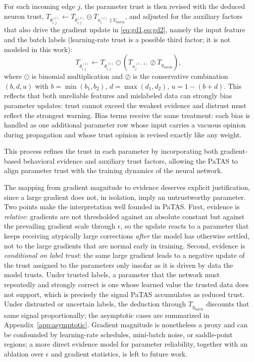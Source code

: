 For each incoming edge \(j\), the parameter trust is then revised with the deduced neuron trust, \(T_{\theta_{i,j}^{(l)}} \leftarrow T_{\theta_{i,j}^{(l)}} \circleddash T_{n_{i}^{(l)} \parallel Y_\text{batch}}\), and adjusted for the auxiliary factors that also drive the gradient update in \cref{eq:gd1,eq:gd2}, namely the input feature and the batch labels (learning-rate trust is a possible third factor; it is not modeled in this work):
\begin{equation}
    T_{\theta_{i,j}^{(l)}} \longleftarrow T_{\theta_{i,j}^{(l)}} \odot (T_{x_j^{(l-1)}} \oslash T_{y_\text{batch}}),
\end{equation}
where $\odot$ is binomial multiplication and $\oslash$ is the conservative combination \((b,d,u)\) with \(b = \min(b_1,b_2)\), \(d = \max(d_1,d_2)\), \(u = 1-(b+d)\). This reflects that both unreliable features and mislabeled data can strongly bias parameter updates: trust cannot exceed the weakest evidence and distrust must reflect the strongest warning. Bias terms receive the same treatment: each bias is handled as one additional parameter row whose input carries a vacuous opinion during propagation and whose trust opinion is revised exactly like any weight.

This process refines the trust in each parameter by incorporating both gradient-based behavioral evidence and auxiliary trust factors, allowing the PaTAS to align parameter trust with the training dynamics of the neural network. 

The mapping from gradient magnitude to evidence deserves explicit justification, since a large gradient does not, in isolation, imply an untrustworthy parameter. Two points make the interpretation well founded in PaTAS. First, evidence is \emph{relative}: gradients are not thresholded against an absolute constant but against the prevailing gradient scale through $\epsilon$, so the update reacts to a parameter that keeps receiving atypically large corrections \emph{after} the model has otherwise settled, not to the large gradients that are normal early in training. Second, evidence is \emph{conditional on label trust}: the same large gradient leads to a negative update of the trust assigned to the parameters only insofar as it is driven by data the model trusts. Under trusted labels, a parameter that the network must repeatedly and strongly correct is one whose learned value the trusted data does not support, which is precisely the signal PaTAS accumulates as reduced trust. Under distrusted or uncertain labels, the deduction through $T_{y_\text{batch}}$ discounts that same signal proportionally; the asymptotic cases are summarized in Appendix~\ref{app:asymptotic}. Gradient magnitude is nonetheless a proxy and can be confounded by learning-rate schedules, mini-batch noise, or saddle-point regions; a more direct evidence model for parameter reliability, together with an ablation over $\epsilon$ and gradient statistics, is left to future work.


